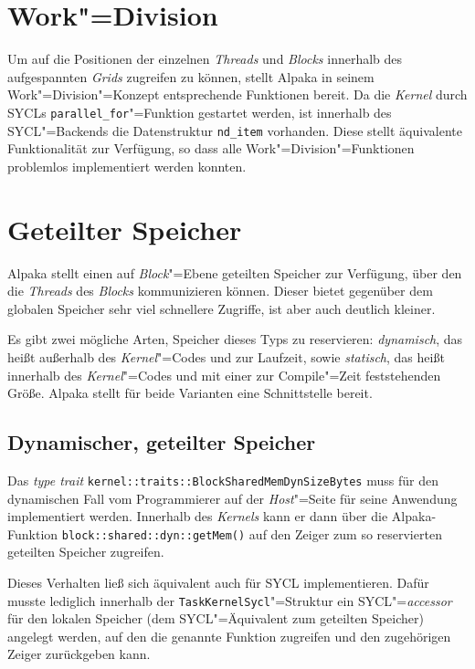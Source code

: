 \section{Work"=Division}
\label{implementierung:workDiv}

Um auf die Positionen der einzelnen \textit{Threads} und \textit{Blocks}
innerhalb des aufgespannten \textit{Grids} zugreifen zu können, stellt Alpaka
in seinem Work"=Division"=Konzept entsprechende Funktionen bereit. Da die
\textit{Kernel} durch SYCLs \texttt{parallel\_for}"=Funktion gestartet werden,
ist innerhalb des SYCL"=Backends die Datenstruktur \texttt{nd\_item} vorhanden.
Diese stellt äquivalente Funktionalität zur Verfügung, so dass alle
Work"=Division"=Funktionen problemlos implementiert werden konnten.

\section{Geteilter Speicher}
\label{implementierung:shared}

Alpaka stellt einen auf \textit{Block}"=Ebene geteilten Speicher zur Verfügung,
über den die \textit{Threads} des \textit{Blocks} kommunizieren können. Dieser
bietet gegenüber dem globalen Speicher sehr viel schnellere Zugriffe, ist aber
auch deutlich kleiner. 

Es gibt zwei mögliche Arten, Speicher dieses Typs zu reservieren:
\textit{dynamisch}, das heißt außerhalb des \textit{Kernel}"=Codes und zur
Laufzeit, sowie \textit{statisch}, das heißt innerhalb des \textit{Kernel}"=Codes und mit einer zur
Compile"=Zeit feststehenden Größe. Alpaka stellt für beide Varianten eine
Schnittstelle bereit.

\subsection{Dynamischer, geteilter Speicher}

Das \textit{type trait} \texttt{kernel::traits::BlockSharedMemDynSizeBytes}
muss für den dynamischen Fall vom Programmierer auf der \textit{Host}"=Seite für
seine Anwendung implementiert werden. Innerhalb des \textit{Kernels} kann er dann über
die Alpaka-Funktion \texttt{block::shared::dyn::getMem()} auf den Zeiger zum so
reservierten geteilten Speicher zugreifen.

Dieses Verhalten ließ sich äquivalent auch für SYCL implementieren. Dafür musste
lediglich innerhalb der \texttt{TaskKernelSycl}"=Struktur ein
SYCL"=\textit{accessor} für den lokalen Speicher (dem SYCL"=Äquivalent zum
geteilten Speicher) angelegt werden, auf den die genannte Funktion zugreifen und
den zugehörigen Zeiger zurückgeben kann.

